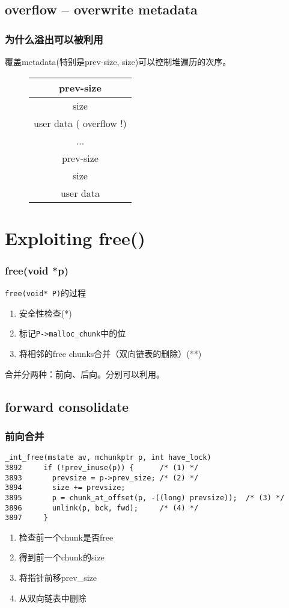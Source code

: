 \documentclass[t]{beamer}
\begin{document}
\subsection{overflow -- overwrite metadata}
\begin{frame}
\frametitle{\kaishu 为什么溢出可以被利用}
覆盖metadata(特别是prev-size, size)可以控制堆遍历的次序。
\begin{figure}
\centering
\begin{tabular}{|c|}
  \hline
  prev-size \\ \hline
  size \\ \hline
  user data ( overflow !) \\ \hline
  ... \\ \hline
  prev-size \\ \hline
  size \\ \hline
  user data \\ \hline
\end{tabular}
\end{figure}
\end{frame}

\section{Exploiting free()}
\begin{frame}[fragile]
\frametitle{free(void *p)}
\texttt{free(void* P)}的过程
\begin{enumerate}
  \item 安全性检查(*)
  \item 标记\texttt{P->malloc\_chunk}中的位
  \item 将相邻的free chunks合并（双向链表的删除）(**)
\end{enumerate}
合并分两种：前向、后向。分别可以利用。
\end{frame}

\subsection{forward consolidate}
\begin{frame}[fragile]
\frametitle{\kaishu 前向合并}
\begin{lstlisting}
_int_free(mstate av, mchunkptr p, int have_lock)
3892     if (!prev_inuse(p)) {      /* (1) */
3893       prevsize = p->prev_size; /* (2) */
3894       size += prevsize;
3895       p = chunk_at_offset(p, -((long) prevsize));  /* (3) */
3896       unlink(p, bck, fwd);     /* (4) */
3897     }
\end{lstlisting}
\begin{enumerate}
  \item 检查前一个chunk是否free
  \item 得到前一个chunk的size
  \item 将指针前移prev\_size
  \item 从双向链表中删除
\end{enumerate}
\end{frame}
\end{document}

